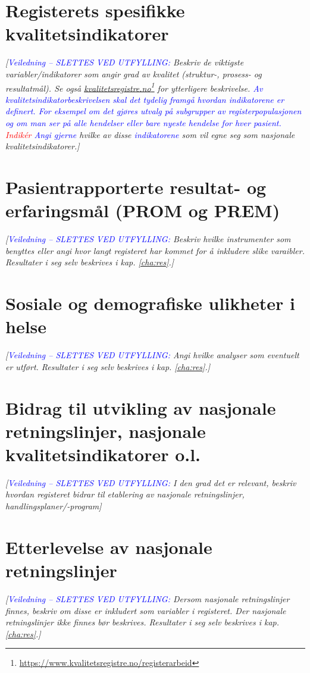 \documentclass[norsk, a4paper, twocolumn]{report}
\newcommand{\newtext}[1]{\cbstart\textcolor{blue}{#1\cbend}}
\newcommand{\oldtext}[1]{\cbdelete\textcolor{red}{#1}}
\newcommand{\guide}[1] {
	\textit{[\textcolor{guidegray}{\newtext{Veiledning -- SLETTES VED UTFYLLING:} #1}]}
	}
\begin{document}
\section{Registerets spesifikke kvalitetsindikatorer}\label{sec:regspe}
\guide{Beskriv de viktigste variabler/indikatorer som angir grad av
kvalitet (struktur-, prosess- og resultatmål). Se også
\href{https://www.kvalitetsregistre.no/registerarbeid}{kvalitetsregistre.no}\footnote{\url{https://www.kvalitetsregistre.no/registerarbeid}}
for ytterligere beskrivelse. \newtext{Av 
kvalitetsindikatorbeskrivelsen skal det tydelig framgå hvordan indikatorene er definert. \it{For eksempel}
om det gjøres utvalg på subgrupper av registerpopulasjonen og om man ser på alle hendelser eller bare 
nyeste hendelse for hver pasient.} \oldtext{Indikér} \newtext{Angi gjerne} hvilke av disse
\newtext{indikatorene} som vil egne seg som nasjonale kvalitetsindikatorer.}

\section{Pasientrapporterte resultat- og erfaringsmål (PROM og PREM)}\label{sec:pasutk}
\guide{Beskriv hvilke instrumenter som benyttes eller angi hvor langt
registeret har kommet for å inkludere slike varaibler. Resultater i seg selv
beskrives i kap. \ref{cha:res}.}

\section{Sosiale og demografiske ulikheter i helse}\label{sec:sosdem}
\guide{Angi hvilke analyser som eventuelt er utført. Resultater i seg selv
beskrives i kap. \ref{cha:res}.}

\section{Bidrag til utvikling av nasjonale retningslinjer, nasjonale
kvalitetsindikatorer o.l.}\label{sec:retut}
\guide{I den grad det er relevant, beskriv hvordan registeret bidrar til
etablering av nasjonale retningslinjer, handlingsplaner/-program}

\section{Etterlevelse av nasjonale retningslinjer}\label{sec:retbru}
\guide{Dersom nasjonale retningslinjer finnes, beskriv om disse er inkludert
som variabler i registeret. Der nasjonale retningslinjer ikke finnes bør
\normalfont{best practice}
\textit{beskrives. Resultater i seg selv beskrives i kap. \ref{cha:res}.}}
\end{document}
